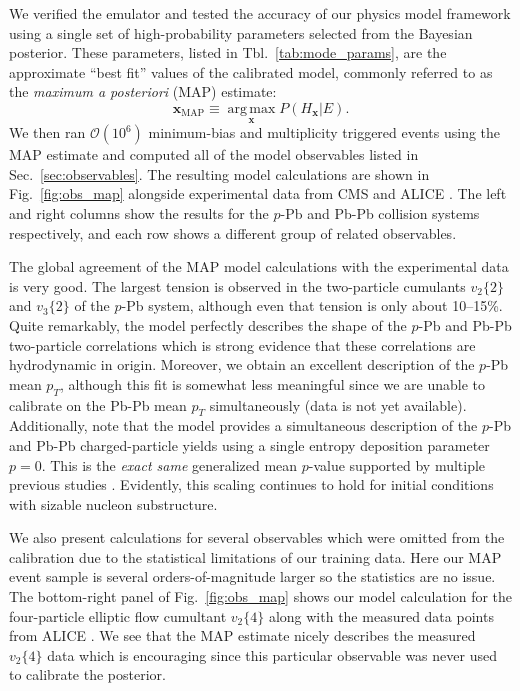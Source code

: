 \documentclass[aps,prc,reprint,amsmath,nofootinbib]{revtex4-1}
\newcommand{\x}{\mathbf{x}}
\newcommand{\vnk}[2]{v_#1\{#2\}}
\newcommand{\order}[1]{$\mathcal O(10^{#1})$}
\begin{document}
We verified the emulator and tested the accuracy of our physics model framework using a single set of high-probability parameters selected from the Bayesian posterior.
These parameters, listed in Tbl.~\ref{tab:mode_params}, are the approximate ``best fit'' values of the calibrated model, commonly referred to as the \emph{maximum a posteriori} (MAP) estimate:
\begin{equation}
  \x_\mathrm{MAP} \equiv \operatorname*{arg\, max}_{\x} P(H_\x | E).
\end{equation}
We then ran \order{6} minimum-bias and multiplicity triggered events using the MAP estimate and computed all of the model observables listed in Sec.~\ref{sec:observables}.
The resulting model calculations are shown in Fig.~\ref{fig:obs_map} alongside experimental data from CMS \cite{Chatrchyan:2013nka} and ALICE \cite{Adam:2015ptt, Adam:2016izf, Adam:2014qja, Abelev:2013bla}.
The left and right columns show the results for the $p$-Pb and Pb-Pb collision systems respectively, and each row shows a different group of related observables.

The global agreement of the MAP model calculations with the experimental data is very good.
The largest tension is observed in the two-particle cumulants $\vnk{2}{2}$ and $\vnk{3}{2}$ of the $p$-Pb system, although even that tension is only about 10--15\%.
Quite remarkably, the model perfectly describes the shape of the $p$-Pb and Pb-Pb two-particle correlations which is strong evidence that these correlations are hydrodynamic in origin.
Moreover, we obtain an excellent description of the \mbox{$p$-Pb} mean $p_T$, although this fit is somewhat less meaningful since we are unable to calibrate on the Pb-Pb mean $p_T$ simultaneously (data is not yet available).
Additionally, note that the model provides a simultaneous description of the \mbox{$p$-Pb} and Pb-Pb charged-particle yields using a single entropy deposition parameter $p=0$.
This is the \emph{exact same} generalized mean $p$-value supported by multiple previous studies \cite{Moreland:2014oya, Bernhard:2016tnd, Ke:2016jrd, Bernhard:2018hnz}.
Evidently, this scaling continues to hold for initial conditions with sizable nucleon substructure.

We also present calculations for several observables which were omitted from the calibration due to the statistical limitations of our training data.
Here our MAP event sample is several orders-of-magnitude larger so the statistics are no issue.
The bottom-right panel of Fig.~\ref{fig:obs_map} shows our model calculation for the four-particle elliptic flow cumultant $\vnk{2}{4}$ along with the measured data points from \mbox{ALICE} \cite{Adam:2016izf}.
We see that the MAP estimate nicely describes the measured $\vnk{2}{4}$ data which is encouraging since this particular observable was never used to calibrate the posterior.
\end{document}

